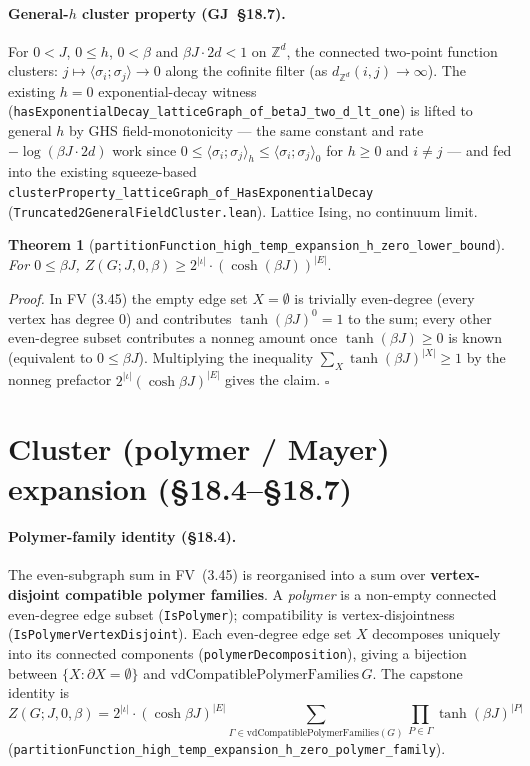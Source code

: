 \documentclass[a4paper,11pt]{article}
\newtheorem{theorem}{Theorem}
\begin{document}
\paragraph{General-\(h\) cluster property (GJ~\S18.7).} For \(0<J\),
\(0\le h\), \(0<\beta\) and \(\beta J\cdot 2d<1\) on \(\mathbb{Z}^d\), the
connected two-point function clusters: \(j\mapsto\langle\sigma_i;\sigma_j\rangle
\to 0\) along the cofinite filter (as \(d_{\mathbb{Z}^d}(i,j)\to\infty\)). The
existing \(h=0\) exponential-decay witness
(\texttt{hasExponentialDecay\_latticeGraph\_of\_betaJ\_two\_d\_lt\_one}) is
lifted to general \(h\) by GHS field-monotonicity — the same constant and rate
\(-\log(\beta J\cdot 2d)\) work since
\(0\le\langle\sigma_i;\sigma_j\rangle_h\le\langle\sigma_i;\sigma_j\rangle_0\)
for \(h\ge 0\) and \(i\neq j\) — and fed into the existing squeeze-based
\texttt{clusterProperty\_latticeGraph\_of\_HasExponentialDecay}
(\texttt{Truncated2GeneralFieldCluster.lean}). Lattice Ising, no continuum
limit.

\begin{theorem}[\texttt{partitionFunction\_high\_temp\_expansion\_h\_zero\_lower\_bound}]
For \(0 \le \beta J\),
\(Z(G; J, 0, \beta) \ge 2^{|\iota|} \cdot (\cosh(\beta J))^{|E|}.\)
\end{theorem}

\textit{Proof.} In FV (3.45) the empty edge set \(X = \emptyset\) is
trivially even-degree (every vertex has degree \(0\)) and contributes
\(\tanh(\beta J)^0 = 1\) to the sum; every other even-degree subset
contributes a nonneg amount once \(\tanh(\beta J) \ge 0\) is known
(equivalent to \(0 \le \beta J\)). Multiplying the inequality
\(\sum_X \tanh(\beta J)^{|X|} \ge 1\) by the nonneg prefactor
\(2^{|\iota|} (\cosh \beta J)^{|E|}\) gives the claim.
\hfill$\square$

\section{Cluster (polymer / Mayer) expansion (\S18.4--\S18.7)}

\paragraph{Polymer-family identity (\S18.4).} The
even-subgraph sum in FV~(3.45) is reorganised into a sum over
\textbf{vertex-disjoint compatible polymer families}. A
\emph{polymer} is a non-empty connected even-degree edge subset
(\texttt{IsPolymer}); compatibility is vertex-disjointness
(\texttt{IsPolymerVertexDisjoint}). Each even-degree edge set $X$
decomposes uniquely into its connected components
(\texttt{polymerDecomposition}), giving a bijection between
$\{X : \partial X = \emptyset\}$ and
$\mathrm{vdCompatiblePolymerFamilies}\,G$. The capstone identity is
\[
Z(G; J, 0, \beta) = 2^{|\iota|} \cdot (\cosh \beta J)^{|E|}
  \sum_{\Gamma \in \mathrm{vdCompatiblePolymerFamilies}(G)}
    \prod_{P \in \Gamma} \tanh(\beta J)^{|P|}
\]
(\texttt{partitionFunction\_high\_temp\_expansion\_h\_zero\_polymer\_family}).
\end{document}
